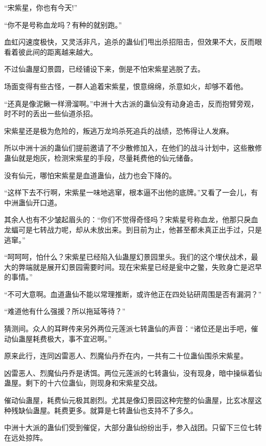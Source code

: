 
\begin{this_body}

“宋紫星，你也有今天!”

“你不是号称血龙吗？有种的就别跑。”

血虹闪速度极快，又灵活非凡，追杀的蛊仙们甩出杀招阻击，但效果不大，反而眼看着彼此间的距离越来越大。

不过仙蛊屋幻景圆，已经铺设下来，倒是不怕宋紫星逃脱了去。

场面变得有些古怪，一群人追着宋紫星，恨意绵绵，杀意如火，却够不着他。

“还真是像泥鳅一样滑溜啊。”中洲十大古派的蛊仙没有动身追击，反而抱臂旁观，时不时的丢出一些仙道杀招。

宋紫星还是极为危险的，叛逃万龙坞杀死追兵的战绩，恐怖得让人发麻。

所以中洲十派的蛊仙们提前邀请了不少散修加入，在他们的战斗计划中，这些散修蛊仙就是炮灰，检测宋紫星的手段，尽量耗费他的仙元储备。

没有仙元，哪怕宋紫星是血道蛊仙，战力也会下降的。

“这样下去不行啊，宋紫星一味地逃窜，根本逼不出他的底牌。”又看了一会儿，有中洲蛊仙开口道。

其余人也有不少皱起眉头的：“你们不觉得奇怪吗？宋紫星号称血龙，他那只戾血龙蝠可是七转战力呢，却从未放出来。到目前为止，他甚至都未真正出手过，只是逃窜。”

“呵呵呵，怕什么？宋紫星已经陷入仙蛊屋幻景园里头。我们的这个埋伏战术，最大的弊端就是展开幻景园需要时间。现在宋紫星已经是瓮中之鳖，失败身亡是迟早的事情。”

“不可大意啊。血道蛊仙不能以常理推断，或许他正在四处钻研周围是否有漏洞？”

“难道他有什么强援？所以拖延等待？”

猜测间。众人的耳畔传来另外两位元莲派七转蛊仙的声音：“诸位还是出手吧，催动仙蛊屋耗费极大，事不宜迟啊。”

原来此行，连同凶雷恶人、烈魔仙丹乔在内，一共有二十位蛊仙围杀宋紫星。

凶雷恶人、烈魔仙丹乔是诱饵。两位元莲派的七转蛊仙，没有现身，暗中操纵着仙蛊屋。剩下的十六位蛊仙，则现身和宋紫星交战。

催动仙蛊屋，耗费仙元极其剧烈。尤其是像幻景园这种完整的仙蛊屋，比玄冰屋这种残缺仙蛊屋。耗费更多。就算是七转蛊仙也支持不了多久。

中洲十大派的蛊仙们受到催促，大部分蛊仙纷纷出手，参入战团。只留下三位七转在远处掠阵。


\end{this_body}
